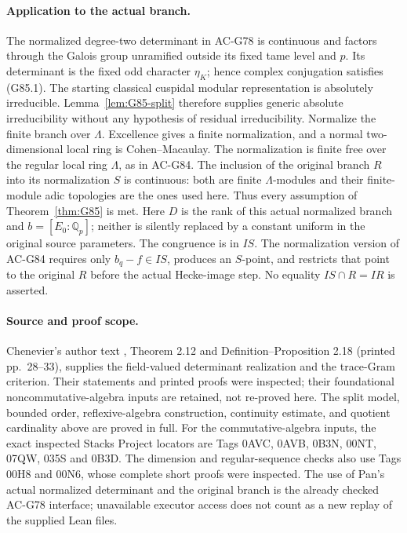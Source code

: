 \paragraph{Application to the actual branch.}
The normalized degree-two determinant in AC-G78 is continuous and
factors through the Galois group unramified outside its fixed tame
level and \(p\).
Its determinant is the fixed odd character \(\eta_K\);
hence complex conjugation satisfies (G85.1).
The starting classical cuspidal modular representation is absolutely
irreducible. Lemma~\ref{lem:G85-split} therefore supplies generic
absolute irreducibility without any hypothesis of residual
irreducibility.
Normalize the finite branch over \(\Lambda\).
Excellence gives a finite normalization, and a normal
two-dimensional local ring is Cohen--Macaulay.
The normalization is finite free over the regular local ring
\(\Lambda\), as in AC-G84.
The inclusion of the original branch \(R\) into its normalization
\(S\) is continuous: both are finite \(\Lambda\)-modules and their
finite-module adic topologies are the ones used here.
Thus every assumption of Theorem~\ref{thm:G85} is met.
Here \(D\) is the rank of this actual normalized branch and
\(b=[E_0:\mathbb Q_p]\); neither is silently replaced by a constant
uniform in the original source parameters.
The congruence is in \(IS\).  The normalization version of AC-G84
requires only \(b_q-f\in IS\), produces an \(S\)-point, and restricts
that point to the original \(R\) before the actual Hecke-image step.
No equality \(IS\cap R=IR\) is asserted.

\paragraph{Source and proof scope.}
Chenevier's author text
,
Theorem 2.12 and Definition--Proposition 2.18
(printed pp.\ 28--33), supplies the field-valued determinant
realization and the trace-Gram criterion.
Their statements and printed proofs were inspected; their foundational
noncommutative-algebra inputs are retained, not re-proved here.
The split model, bounded order, reflexive-algebra construction,
continuity estimate, and quotient cardinality above are proved in full.
For the commutative-algebra inputs, the exact inspected Stacks Project
locators are Tags 0AVC, 0AVB, 0B3N, 00NT, 07QW, 035S and 0B3D.
The dimension and regular-sequence checks also use Tags 00H8 and 00N6,
whose complete short proofs were inspected.
The use of Pan's actual normalized determinant and the original
branch is the already checked AC-G78 interface; unavailable executor
access does not count as a new replay of the supplied Lean files.

